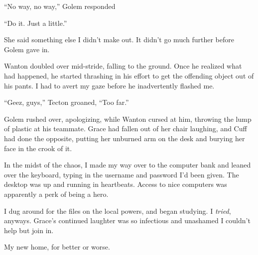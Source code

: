 ``No way, no way,'' Golem responded



``Do it.  Just a little.''



She said something else I didn't make out.  It didn't go much further before Golem gave in.



Wanton doubled over mid-stride, falling to the ground.  Once he realized what had happened, he started thrashing in his effort to get the offending object out of his pants.  I had to avert my gaze before he inadvertently flashed me.



``Geez, guys,'' Tecton groaned, ``Too far.''



Golem rushed over, apologizing, while Wanton cursed at him, throwing the lump of plastic at his teammate.  Grace had fallen out of her chair laughing, and Cuff had done the opposite, putting her unburned arm on the desk and burying her face in the crook of it.



In the midst of the chaos, I made my way over to the computer bank and leaned over the keyboard, typing in the username and password I'd been given.  The desktop was up and running in heartbeats.  Access to nice computers was apparently a perk of being a hero.



I dug around for the files on the local powers, and began studying.  I \emph{tried}, anyways.  Grace's continued laughter was so infectious and unashamed I couldn't help but join in.



My new home, for better or worse.





